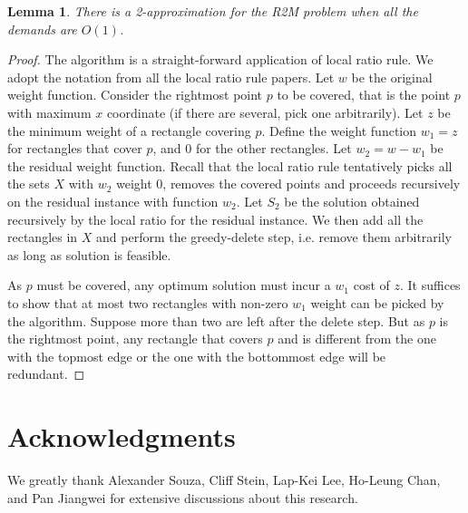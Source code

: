 \documentclass[11pt]{article}
\newtheorem{lemma}[thm]{Lemma}
\begin{document}
\begin{lemma}
\label{r2mlemma}
There is a 2-approximation for the R2M problem when all the demands are $O(1)$.
\end{lemma}
\begin{proof}
The algorithm is a straight-forward
application of local ratio rule. We adopt the notation from all the local ratio rule papers. Let $w$ be
the original weight function. Consider the rightmost point $p$ to be covered, that is the point $p$ with
maximum $x$ coordinate (if there are several, pick one arbitrarily). 
Let $z$ be the minimum weight of a rectangle
covering $p$. Define the weight function $w_1 = z$ for rectangles that cover $p$, and 0 for the other rectangles. Let $w_2 = w - w_1$ be the residual weight function.
Recall that the local ratio rule tentatively picks all the sets $X$ with $w_2$ weight 0, removes the covered points and proceeds recursively on the residual instance with function $w_2$.
Let $S_2$ be the solution obtained recursively by the local ratio for the residual instance.
We then add all the rectangles in $X$ and perform the greedy-delete step, i.e. remove them arbitrarily as
long as solution is feasible.

As $p$ must be covered, any optimum solution must incur a $w_1$ cost of $z$.
It suffices to show that at most two rectangles with non-zero $w_1$ weight can be picked by the algorithm.
Suppose more than two are left after the delete step. But as $p$ is the rightmost point, any rectangle that covers $p$ and is different from the one with the topmost edge or the one with the  bottommost edge will be redundant.
\end{proof}


\section*{ Acknowledgments} We greatly thank Alexander Souza, Cliff Stein, Lap-Kei Lee, Ho-Leung Chan,
and Pan Jiangwei for extensive discussions about this research.





\end{document}
